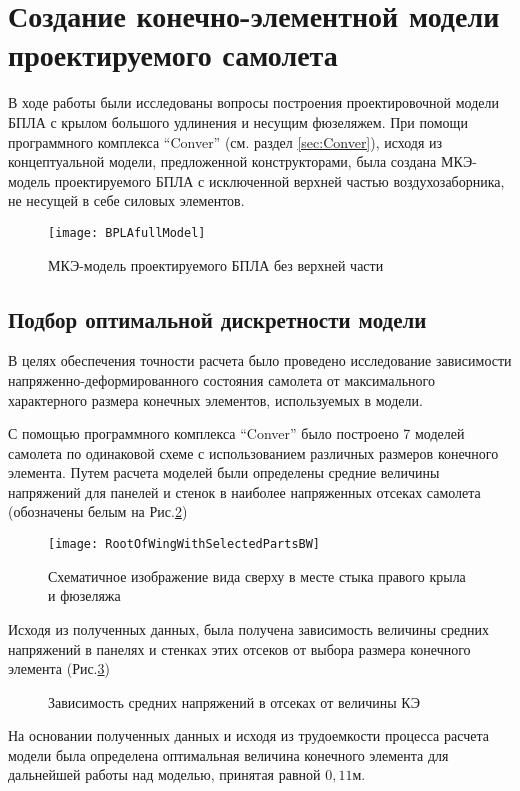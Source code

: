 \section{Создание конечно-элементной модели проектируемого самолета}

В ходе работы были исследованы вопросы построения проектировочной модели БПЛА с крылом большого удлинения и несущим фюзеляжем. При помощи программного комплекса ``Conver'' (см. раздел \ref{sec:Conver}), исходя из концептуальной модели, предложенной конструкторами, была создана МКЭ-модель проектируемого БПЛА с исключенной верхней частью воздухозаборника, не несущей в себе силовых элементов. 

\begin{figure}[ht]
\centering
\texttt{[image: BPLAfullModel]}
\caption{МКЭ-модель проектируемого БПЛА без верхней части}
\label{fig:BPLAfullModel}
\end{figure}

\subsection{Подбор оптимальной дискретности модели}

В целях обеспечения точности расчета было проведено исследование зависимости напряженно-деформированного состояния самолета от максимального характерного размера конечных элементов, используемых в модели. 

С помощью программного комплекса ``Conver'' было построено 7 моделей самолета по одинаковой схеме с использованием различных размеров конечного элемента. Путем расчета моделей были определены средние величины напряжений для панелей и стенок в наиболее напряженных отсеках самолета (обозначены белым на  Рис.\ref{fig:WingRootPlain})

\begin{figure}[ht]
\centering
\texttt{[image: RootOfWingWithSelectedPartsBW]}
\caption{Схематичное изображение вида сверху в месте стыка правого крыла и фюзеляжа}
\label{fig:WingRootPlain}
\end{figure}




Исходя из полученных данных, была получена зависимость величины средних напряжений в панелях и стенках этих отсеков от выбора размера конечного элемента (Рис.\ref{fig:stressToDiscreteness})

\begin{figure}[ht]
\centering

\caption{Зависимость средних напряжений в отсеках от величины КЭ}
\label{fig:stressToDiscreteness}
\end{figure}

На основании полученных данных и исходя из трудоемкости процесса расчета модели была определена оптимальная величина конечного элемента для дальнейшей работы над моделью, принятая равной $0,11\text{м}$. 
